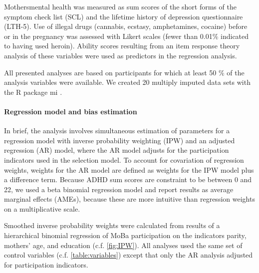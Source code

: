 \documentclass[]{article}
\begin{document}
Mothers\textquotesingle \space mental health was measured as sum scores of the short forms of the symptom check list (SCL)\supercite{Tambs1993-ch} and the lifetime history of depression questionnaire (LTH-5)\supercite{Kendler1993-pf}. Use of illegal drugs (cannabis, ecstasy, amphetamines, cocaine) before or in the pregnancy was assessed with Likert scales (fewer than 0.01\% indicated to having used heroin). Ability scores resulting from an item response theory analysis of these variables \supercite{Rizopoulos2006-bc} were used as predictors in the regression analysis. 



All presented analyses are based on participants for which at least 50 \% of the analysis variables were available. We created 20 multiply imputed data sets with the R package mi \supercite{Su2011-he}. 

\paragraph{Regression model and bias estimation}

In brief, the analysis involves simultaneous estimation of parameters for a regression model with inverse probability weighting (IPW) and an adjusted regression (AR) model, where the AR model adjusts for the participation indicators used in the selection model. To account for covariation of regression weights, weights for the AR model are defined as  weights for the IPW model plus a difference term. Because ADHD sum scores are constraint to be between 0 and 22, we used a beta binomial regression model and report results as average marginal effects (AMEs), because these are more intuitive than regression weights on a multiplicative scale. 

Smoothed inverse probability weights were calculated from results of a hierarchical binomial regression\supercite{Stan_Development_Team_2016-te} of MoBa participation on the indicators parity, mothers' age, and education (c.f. \ref{fig:IPW}). All analyses used the same set of control variables (c.f. \ref{table:variables}) except that only the AR analysis adjusted for participation indicators.
\end{document}
